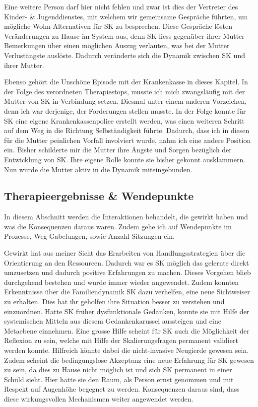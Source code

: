 Eine weitere Person darf hier nicht fehlen und zwar ist dies der Vertreter des Kinder- \& Jugenddienstes, mit welchem wir gemeinsame Gespräche führten, um mögliche Wohn-Alternativen für SK zu besprechen. Diese Gespräche lösten Veränderungen zu Hause im System aus, denn SK liess gegenüber ihrer Mutter Bemerkungen über einen möglichen Auszug verlauten, was bei der Mutter Verlustängste auslöste. Dadurch veränderte sich die Dynamik zwischen SK und ihrer Mutter.

Ebenso gehört die Unschöne Episode mit der Krankenkasse in dieses Kapitel. In der Folge des verordneten Therapiestops, musste ich mich zwangsläufig mit der Mutter von SK in Verbindung setzen. Diesmal unter einem anderen Vorzeichen, denn ich war derjenige, der Forderungen stellen musste. In der Folge konnte für SK eine eigene Krankenkassenpolice erstellt werden, was einen weiteren Schritt auf dem Weg in die Richtung Selbständigkeit führte. Dadurch, dass ich in diesen für die Mutter peinlichen Vorfall involviert wurde, nahm ich eine andere Position ein. Bisher schilderte mir die Mutter ihre Ängste und Sorgen bezüglich der Entwicklung von SK. Ihre eigene Rolle konnte sie bisher gekonnt ausklammern. Nun wurde die Mutter aktiv in die Dynamik miteingebunden. 
 

\subsection{Therapieergebnisse \& Wendepunkte} \label{sc:therapieergebnisse}
In diesem Abschnitt werden die Interaktionen behandelt, die gewirkt haben und was die Konsequenzen daraus waren. Zudem gehe ich auf Wendepunkte im Prozesse, Weg-Gabelungen, sowie Anzahl Sitzungen ein. 

Gewirkt hat aus meiner Sicht das Erarbeiten von Handlungsstrategien über die Orientierung an den Ressourcen. Dadurch war es SK möglich das gelernte direkt umzusetzen und dadurch positive Erfahrungen zu machen. Dieses Vorgehen blieb durchgehend bestehen und wurde immer wieder angewendet. Zudem konnten Erkenntnisse über die Familiendynamik SK dazu verhelfen, eine neue Sichtweiser zu erhalten. Dies hat ihr geholfen ihre Situation besser zu verstehen und einzuordnen. Hatte SK früher dysfunktionale Gedanken, konnte sie mit Hilfe der systemischen Mitteln aus diesem Gedankenkarussel aussteigen und eine Metaebene einnehmen. Eine grosse Hilfe scheint für SK auch die Möglichkeit der Reflexion zu sein, welche mit Hilfe der Skalierungsfragen permanent validiert werden konnte. Hilfreich könnte dabei die nicht-invasive Neugierde gewesen sein. Zudem scheint die bedingungslose Akzeptanz eine neue Erfahrung für SK gewesen zu sein, da dies zu Hause nicht möglich ist und sich SK permanent in einer Schuld sieht. Hier hatte sie den Raum, als Person ernst genommen und mit Respekt auf Augenhöhe begegnet zu werden. Konsequenzen daraus sind, dass diese wirkungsvollen Mechanismen weiter angewendet werden.  

